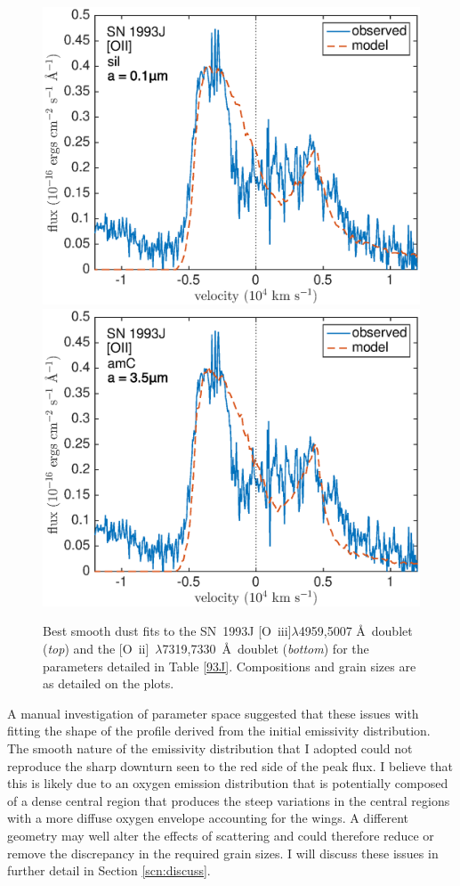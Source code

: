 {\begin{figure}[!t]
\includegraphics[scale=0.4,clip=true, trim=0 0 40 20]{chapters/chapter6/figs/93J/smooth/OII}
\includegraphics[scale=0.4,clip=true, trim=30 0 40 20]{chapters/chapter6/figs/93J/smooth/OII_amC}
\caption{Best smooth dust fits to the SN~1993J [O~{\sc iii}]$\lambda$4959,5007 \AA\ doublet ({\em top}) and the [O~{\sc ii}]~$\lambda$7319,7330~\AA\ doublet ({\em bottom}) for the parameters detailed in Table \ref{93J}.  Compositions and grain sizes are as detailed on the plots.}
\label{93J_smooth}
\end{figure}
}

A manual investigation of parameter space suggested that these issues with fitting the shape of the profile derived from the initial emissivity distribution.  The smooth nature of the emissivity distribution that I adopted could not reproduce the sharp downturn seen to the red side of the peak flux.  I believe that this is likely due to an oxygen emission distribution that is potentially composed of a dense central region that produces the steep variations in the central regions with a more diffuse oxygen envelope accounting for the wings.  A different geometry may well alter the effects of scattering and could therefore reduce or remove the discrepancy in the required grain sizes.  I will discuss these issues in further detail in Section \ref{scn:discuss}.

